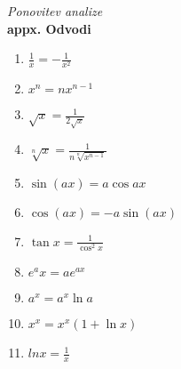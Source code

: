 \textit{Ponovitev analize}\\

\textbf{appx. Odvodi}
\begin{center}
    \begin{small}
        \begin{enumerate}
            \item \begin{math}
                \frac{1}{x} = -\frac{1}{x^2}
            \end{math}
            \item \begin{math}
                x^n  = nx^{n-1}
            \end{math}
            \item \begin{math}
                \sqrt{x} = \frac{1}{2 \sqrt{x}}
            \end{math}
            \item \begin{math}
                \sqrt[n] x = \frac{1}{n \sqrt[n]{x^{n-1}}}
            \end{math}
            \item \begin{math}
                \sin (a x) =  a  \cos a x
            \end{math}
            \item  \begin{math}
                \cos (a x) = - a \sin (a x)
            \end{math}
            \item \begin{math}
                \tan x = \frac{1}{\cos^2 x} 
            \end{math}
            \item \begin{math}
                e^ax = ae^{ax}
            \end{math}
            \item \begin{math}
                a^x = a^x \ln a
            \end{math}
            \item \begin{math}
                x^x = x^x (1+\ln x)
            \end{math}
            \item \begin{math}
                ln x = \frac{1}{x}

\end{math}
\end{enumerate}
\end{small}
\end{center}
